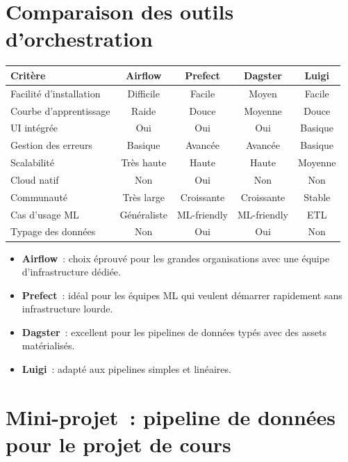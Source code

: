 \section{Comparaison des outils d'orchestration}
\label{sec:orchestration-comparison}

\begin{center}
\begin{tabular}{@{}lcccc@{}}
\toprule
\textbf{Crit\`ere} & \textbf{Airflow} & \textbf{Prefect} &
  \textbf{Dagster} & \textbf{Luigi} \\
\midrule
Facilit\'e d'installation & Difficile & Facile & Moyen & Facile \\
Courbe d'apprentissage & Raide & Douce & Moyenne & Douce \\
UI int\'egr\'ee & Oui & Oui & Oui & Basique \\
Gestion des erreurs & Basique & Avanc\'ee & Avanc\'ee & Basique \\
Scalabilit\'e & Tr\`es haute & Haute & Haute & Moyenne \\
Cloud natif & Non & Oui & Non & Non \\
Communaut\'e & Tr\`es large & Croissante & Croissante & Stable \\
Cas d'usage ML & G\'en\'eraliste & ML-friendly & ML-friendly & ETL \\
Typage des donn\'ees & Non & Oui & Oui & Non \\
\bottomrule
\end{tabular}
\end{center}

\begin{attention}[title=\textbf{Choisir le bon outil}]
\begin{itemize}
  \item \textbf{Airflow}~: choix \'eprouv\'e pour les grandes organisations
    avec une \'equipe d'infrastructure d\'edi\'ee.
  \item \textbf{Prefect}~: id\'eal pour les \'equipes ML qui veulent
    d\'emarrer rapidement sans infrastructure lourde.
  \item \textbf{Dagster}~: excellent pour les pipelines de donn\'ees typ\'es
    avec des assets mat\'erialis\'es.
  \item \textbf{Luigi}~: adapt\'e aux pipelines simples et lin\'eaires.
\end{itemize}
\end{attention}

\section{Mini-projet~: pipeline de donn\'ees pour le projet de cours}
\label{sec:mini-project-ch5}


